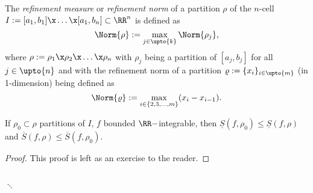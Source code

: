\begin{defn}
  The \emph{refinement measure} or \emph{refinement norm} of a partition $\rho$ of the $n$-cell $I:=[a_1, b_1]\x\ldots \x[a_1, b_n]\subset \RR^n$ is defined as $$\Norm{\rho}:=\max_{j\in\upto{k}}\Norm{\rho_j},$$ where $\rho:=\rho_1\x \rho_2\x\ldots\x\rho_n$ with $\rho_j$ being a partition of $[a_j, b_j]$ for all $j\in\upto{n}$ and with the refinement norm of a partition $\varrho:=\{x_i\}_{i\in\upto{m}}$ (in 1-dimension) being defined as $$\Norm{\varrho}:=\max_{i\in\{2, 3,\ldots, m\}} (x_i-x_{i-1}).$$
\end{defn}


\begin{lem}
  \label{lem:refinement}
  If $\rho_0\subset \rho$ partitions of $I$, $f$ bounded $\RR-$integrable, then $\underline{S}(f,\rho_0)\leq \underline{S}(f,\rho)$ and $\overline{S}(f,\rho)\leq\overline{S}(f,\rho_0)$.
\end{lem}
\begin{proof}
  This proof is left as an exercise to the reader.
\end{proof}

\begin{defn}
  \ \\$\ddots$
\end{defn}